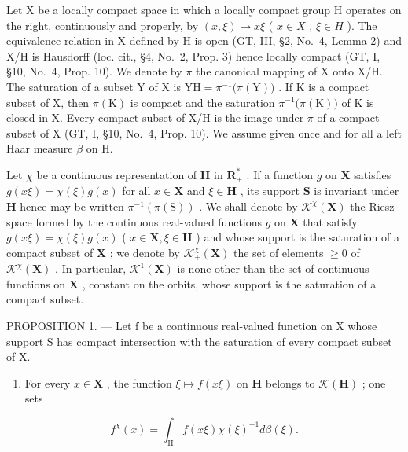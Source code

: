 Let X be a locally compact space in which a locally compact group H operates on the right, continuously and properly, by \((x,\xi)\mapsto x\xi\) ( \(x\in X\) , \(\xi\in H\) ). The equivalence relation in X defined by H is open (GT, III, §2, No.~4, Lemma 2) and X/H is Hausdorff (loc. cit., §4, No.~2, Prop. 3) hence locally compact (GT, I, §10, No.~4, Prop. 10). We denote by \(\pi\) the canonical mapping of X onto X/H. The saturation of a subset Y of X is \(\mathrm{YH}=\pi^{-1}\big(\pi(\mathrm{Y})\big)\) . If K is a compact subset of X, then \(\pi(\mathrm{K})\) is compact and the saturation \(\pi^{-1}\big(\pi(\mathrm{K})\big)\) of K is closed in X. Every compact subset of X/H is the image under \(\pi\) of a compact subset of X (GT, I, §10, No.~4, Prop. 10). We assume given once and for all a left Haar measure \(\beta\) on H.

Let \(\chi\) be a continuous representation of \(\mathbf{H}\) in \(\mathbf{R}_+^*\) . If a function \(g\) on \(\mathbf{X}\) satisfies \(g(x\xi) = \chi (\xi)g(x)\) for all \(x\in \mathbf{X}\) and \(\xi \in \mathbf{H}\) , its support \(\mathbf{S}\) is invariant under \(\mathbf{H}\) hence may be written \(\pi^{-1} (\pi (\mathrm{S}))\) . We shall denote by \(\mathcal{K}^{\chi}(\mathbf{X})\) the Riesz space formed by the continuous real-valued functions \(g\) on \(\mathbf{X}\) that satisfy \(g(x\xi) = \chi (\xi)g(x)\) ( \(x\in \mathbf{X},\xi \in \mathbf{H}\) ) and whose support is the saturation of a compact subset of \(\mathbf{X}\) ; we denote by \(\mathcal{K}_+^\chi (\mathbf{X})\) the set of elements \(\geqslant 0\) of \(\mathcal{K}^{\chi}(\mathbf{X})\) . In particular, \(\mathcal{K}^1 (\mathbf{X})\) is none other than the set of continuous functions on \(\mathbf{X}\) , constant on the orbits, whose support is the saturation of a compact subset.

PROPOSITION 1. --- Let f be a continuous real-valued function on X whose support S has compact intersection with the saturation of every compact subset of X.

\begin{enumerate}
\def\labelenumi{\alph{enumi})}
\tightlist
\item
  For every \(x \in \mathbf{X}\) , the function \(\xi \mapsto f(x\xi)\) on \(\mathbf{H}\) belongs to \(\mathcal{K}(\mathbf{H})\) ; one sets
\end{enumerate}

\[
f ^ {\chi} (x) = \int_ {\mathrm{H}} f (x \xi) \chi (\xi) ^ {- 1} d \beta (\xi).\tag{1}
\]

